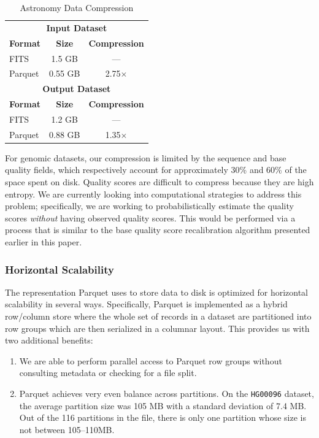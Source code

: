 \documentclass{acm_proc_article-sp}
\begin{document}
\begin{table}[h]
\caption{Astronomy Data Compression}
\label{tab:astro-compression}
\begin{center}
\begin{tabular}{ l c c }
\hline
\multicolumn{3}{c}{\bf Input Dataset} \\
\bf Format & \bf Size & \bf Compression \\
\hline
\hline
FITS & 1.5 GB & --- \\
Parquet & 0.55 GB & 2.75$\times$ \\
\hline
\multicolumn{3}{c}{\bf Output Dataset} \\
\bf Format & \bf Size & \bf Compression \\
\hline
\hline
FITS & 1.2 GB & --- \\
Parquet & 0.88 GB & 1.35$\times$ \\
\hline
\end{tabular}
\end{center}
\end{table}

For genomic datasets, our compression is limited by the sequence and base quality fields, which respectively
account for approximately 30\% and 60\% of the space spent on disk. Quality scores are difficult to compress
because they are high entropy. We are currently looking into computational strategies to address this problem;
specifically, we are working to probabilistically estimate the quality scores \emph{without} having observed quality
scores. This would be performed via a process that is similar to the base quality score recalibration algorithm
presented earlier in this paper.

\subsubsection{Horizontal Scalability}
\label{sec:horizontal-scalability}

The representation Parquet uses to store data to disk is optimized for horizontal scalability in several ways.
Specifically, Parquet is implemented as a hybrid row/column store where the whole set of records in a dataset
are partitioned into row groups which are then serialized in a columnar layout. This provides us with two additional
benefits:

\begin{enumerate}
\item We are able to perform parallel access to Parquet row groups without consulting metadata or checking for
a file split.
\item Parquet achieves very even balance across partitions. On the \texttt{HG00096} dataset, the average
partition size was 105 MB with a standard deviation of 7.4 MB. Out of the 116 partitions in the file, there is only
one partition whose size is not between 105--110MB.
\end{enumerate}
\end{document}
